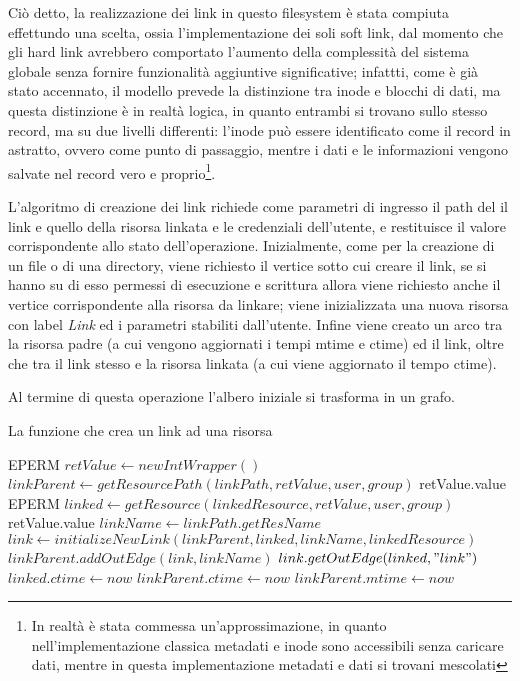 Ciò detto, la realizzazione dei link in questo filesystem è stata compiuta effettundo una scelta, ossia l'implementazione dei soli soft link, dal momento che gli hard link avrebbero comportato l'aumento della complessità del sistema globale senza fornire funzionalità aggiuntive significative; infattti, come è già stato accennato, il modello prevede la distinzione tra inode e blocchi di dati, ma questa distinzione è in realtà logica, in quanto entrambi si trovano sullo stesso record, ma su due livelli differenti: l'inode può essere identificato come il record in astratto, ovvero come punto di passaggio, mentre i dati e le informazioni vengono salvate nel record vero e proprio\footnote{In realtà è stata commessa un'approssimazione, in quanto nell'implementazione classica metadati e inode sono accessibili senza caricare dati, mentre in questa implementazione metadati e dati si trovani mescolati}.

L'algoritmo di creazione dei link richiede come parametri di ingresso il path del il link e quello della risorsa linkata e le credenziali dell'utente, e restituisce il valore corrispondente allo stato dell'operazione. Inizialmente, come per la creazione di un file o di una directory, viene richiesto il vertice sotto cui creare il link, se si hanno su di esso permessi di esecuzione e scrittura allora viene richiesto anche il vertice corrispondente alla risorsa da linkare; viene inizializzata una nuova risorsa con label \emph{Link} ed i parametri stabiliti dall'utente. Infine viene creato un arco tra la risorsa padre (a cui vengono aggiornati i tempi mtime e ctime) ed il link, oltre che tra il link stesso e la risorsa linkata (a cui viene aggiornato il tempo ctime). 

Al termine di questa operazione l'albero iniziale si trasforma in un grafo.

\begin{algorithm}
\begin{algorithmic}[5]
\caption{La funzione che crea un link ad una risorsa}
		\State \Return EPERM
	\EndIf
	\State $retValue \gets new IntWrapper()$
	\State $linkParent \gets getResourcePath(linkPath, retValue, user, group)$
		\State \Return retValue.value
	\EndIf
		\State \Return EPERM
	\EndIf
	\State $linked \gets getResource(linkedResource, retValue, user, group)$
		\State \Return retValue.value
	\EndIf
	\State $linkName \gets linkPath.getResName$
	\State $link \gets initializeNewLink(linkParent, linked, linkName, linkedResource)$
	\State $linkParent.addOutEdge(link, linkName)$
	\State $link.getOutEdge(linked, "link")$
	\State $linked.ctime \gets now$
	\State $linkParent.ctime \gets now$
	\State $linkParent.mtime \gets now$
	\State {}
\EndFunction
\end{algorithmic}
\end{algorithm}

